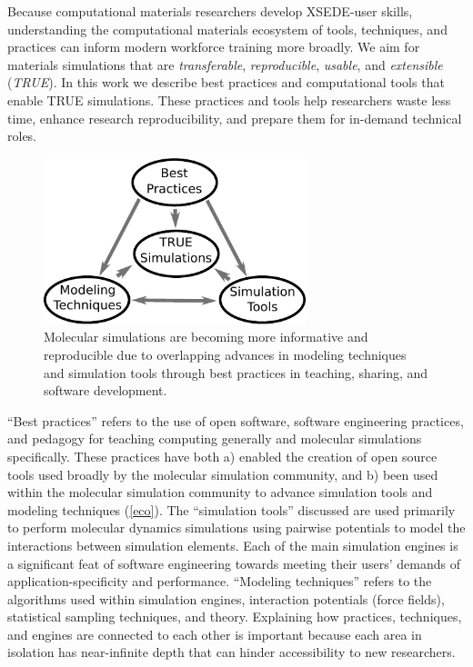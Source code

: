 Because computational materials researchers develop XSEDE-user skills, understanding the computational materials ecosystem of tools, techniques, and practices can inform modern workforce training more broadly. 
We aim for materials simulations that are \textit{transferable}, \textit{reproducible}, \textit{usable}, and \textit{extensible} (\textit{TRUE}).
In this work we describe best practices and computational tools that enable TRUE simulations.
These practices and tools help researchers waste less time, enhance research reproducibility, and prepare them for in-demand technical roles.

\begin{figure}
    \centering
    \includegraphics[width=3in]{figures/pub4/overview_2.pdf}
    \caption{
        Molecular simulations are becoming more informative and reproducible due to overlapping advances in modeling techniques and simulation tools through best practices in teaching, sharing, and software development.
    }\label{eco} %
\end{figure}

``Best practices'' refers to the use of open software, software engineering practices, and pedagogy for teaching computing generally and molecular simulations specifically.
These practices have both a) enabled the creation of open source tools used broadly by the molecular simulation community, and b) been used within the molecular simulation community to advance simulation tools and modeling techniques (\autoref{eco}).
The ``simulation tools'' discussed are used primarily to perform molecular dynamics simulations using pairwise potentials to model the interactions between simulation elements.
Each of the main simulation engines is a significant feat of software engineering towards meeting their users' demands of application-specificity and performance.
``Modeling techniques'' refers to the algorithms used within simulation engines, interaction potentials (force fields), statistical sampling techniques, and theory. 
Explaining how practices, techniques, and engines are connected to each other is important because each area in isolation has near-infinite depth that can hinder accessibility to new researchers.

